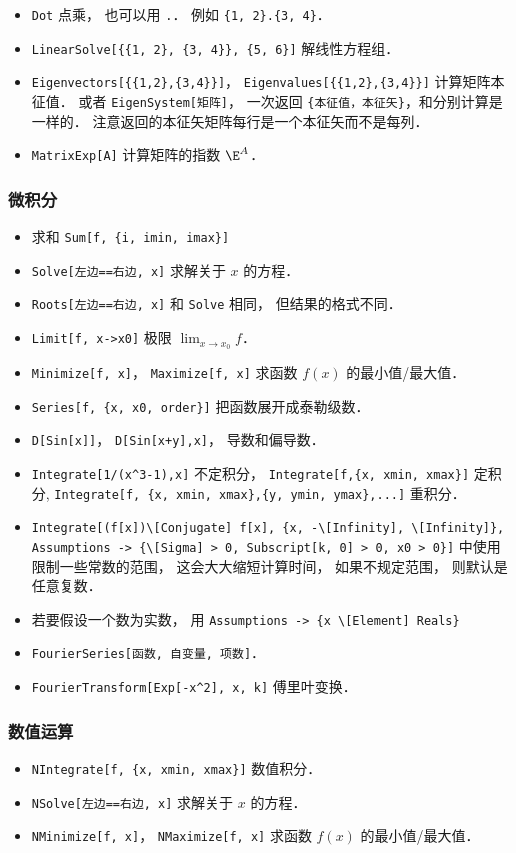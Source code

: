 \begin{itemize}
\item \verb|Dot| 点乘， 也可以用 \verb|.|． 例如 \verb|{1, 2}.{3, 4}|．
\item \verb|LinearSolve[{{1, 2}, {3, 4}}, {5, 6}]| 解线性方程组．
\item \verb|Eigenvectors[{{1,2},{3,4}}]|， \verb|Eigenvalues[{{1,2},{3,4}}]| 计算矩阵本征值． 或者 \verb|EigenSystem[矩阵]|， 一次返回 \verb|{本征值，本征矢}|，和分别计算是一样的． 注意返回的本征矢矩阵每行是一个本征矢而不是每列．
\item \verb|MatrixExp[A]| 计算矩阵的指数 $\E^{A}$．
\end{itemize}

\subsubsection{微积分}
\begin{itemize}
\item 求和 \verb|Sum[f, {i, imin, imax}]|
\item \verb|Solve[左边==右边, x]| 求解关于 $x$ 的方程．
\item \verb|Roots[左边==右边, x]| 和 \verb|Solve| 相同， 但结果的格式不同．
\item \verb|Limit[f, x->x0]| 极限 $\lim_{x\to x_0} f$．
\item \verb|Minimize[f, x]|， \verb|Maximize[f, x]| 求函数 $f(x)$ 的最小值/最大值．
\item \verb|Series[f, {x, x0, order}]| 把函数展开成泰勒级数．
\item \verb|D[Sin[x]]|， \verb|D[Sin[x+y],x]|， 导数和偏导数．
\item \verb|Integrate[1/(x^3-1),x]| 不定积分， \verb|Integrate[f,{x, xmin, xmax}]| 定积分, \verb|Integrate[f, {x, xmin, xmax},{y, ymin, ymax},...]| 重积分．
\item \verb|Integrate[(f[x])\[Conjugate] f[x], {x, -\[Infinity], \[Infinity]}, Assumptions -> {\[Sigma] > 0, Subscript[k, 0] > 0, x0 > 0}]| 中使用限制一些常数的范围， 这会大大缩短计算时间， 如果不规定范围， 则默认是任意复数．
\item 若要假设一个数为实数， 用 \verb|Assumptions -> {x \[Element] Reals}|
\item \verb|FourierSeries[函数, 自变量, 项数]|．
\item \verb|FourierTransform[Exp[-x^2], x, k]| 傅里叶变换．
\end{itemize}

\subsubsection{数值运算}
\begin{itemize}
\item \verb|NIntegrate[f, {x, xmin, xmax}]| 数值积分．
\item \verb|NSolve[左边==右边, x]| 求解关于 $x$ 的方程．
\item \verb|NMinimize[f, x]|， \verb|NMaximize[f, x]| 求函数 $f(x)$ 的最小值/最大值．
\end{itemize}

